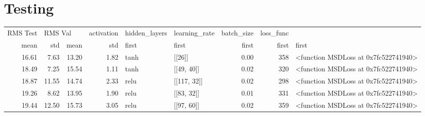 \section{Testing}
\begin{tabular}{rrrrllrrl}
    \toprule
    RMS Test & \multicolumn{2}{l}{RMS Val} & activation & hidden\_layers & learning\_rate & batch\_size &                            loss\_func \\
        mean &   std &    mean &  std &      first &         first &         first &      first &                                first \\
       16.61 &  7.63 &   13.20 & 1.82 &       tanh &        [[26]] &          0.00 &        358 & <function MSDLoss at 0x7fc522741940> \\
    \midrule
       18.49 &  7.25 &   15.54 & 1.11 &       tanh &    [[49, 40]] &          0.02 &        320 & <function MSDLoss at 0x7fc522741940> \\
       18.87 & 11.55 &   14.74 & 2.33 &       relu &   [[117, 32]] &          0.02 &        298 & <function MSDLoss at 0x7fc522741940> \\
       19.26 &  8.62 &   13.95 & 1.90 &       relu &    [[83, 32]] &          0.01 &        331 & <function MSDLoss at 0x7fc522741940> \\
       19.44 & 12.50 &   15.73 & 3.05 &       relu &    [[97, 60]] &          0.02 &        359 & <function MSDLoss at 0x7fc522741940> \\
    \bottomrule
    \end{tabular}
    